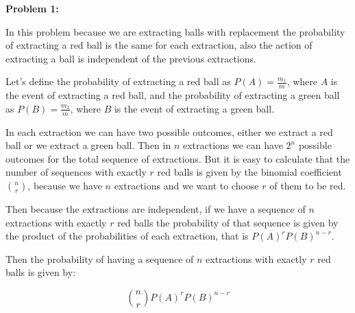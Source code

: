 \textbf{Problem 1:}

\singlespacing

In this problem because we are extracting balls with replacement
the probability of extracting a red ball is the same for each extraction, also
the action of extracting a ball is independent of the previous extractions.

\singlespacing

Let's define the probability of extracting a red ball as $P(A) = \frac{m_1}{m}$, where
$A$ is the event of extracting a red ball, and the probability of extracting a green ball as $P(B) = \frac{m_2}{m}$, where
$B$ is the event of extracting a green ball.

\singlespacing

In each extraction we can have two possible outcomes, either we extract a red ball
or we extract a green ball. Then in $n$ extractions we can have $2^n$ possible outcomes for
the total sequence of extractions. But it is easy to calculate that the number of sequences
with exactly $r$ red balls is given by the binomial coefficient $\binom{n}{r}$, because
we have $n$ extractions and we want to choose $r$ of them to be red.

\singlespacing

Then because the extractions are independent, if we have a sequence of $n$ extractions
with exactly $r$ red balls the probability of that sequence is given by the product of the
probabilities of each extraction, that is $P(A)^r P(B)^{n-r}$.

\singlespacing

Then the probability of having a sequence of $n$ extractions with exactly $r$ red balls is given by:

\singlespacing

\begin{equation}
    \binom{n}{r} P(A)^r P(B)^{n-r}
\end{equation}